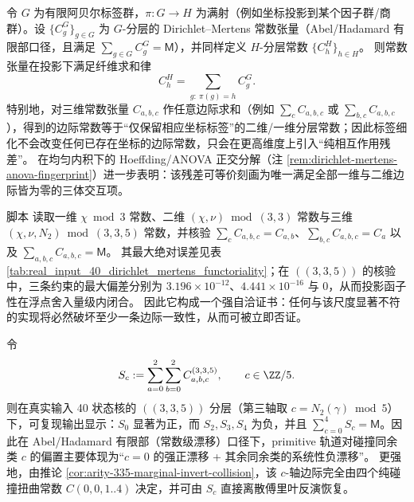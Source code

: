 \begin{remark}\label{thm:dirichlet-mertens-functoriality}
令 \(G\) 为有限阿贝尔标签群，\(\pi:G\to H\) 为满射（例如坐标投影到某个因子群/商群）。设
\(\{C^G_g\}_{g\in G}\) 为 \(G\)-分层的 Dirichlet--Mertens 常数张量（Abel/Hadamard 有限部口径，且满足 \(\sum_{g\in G}C^G_g=\mathsf{M}\)），并同样定义 \(H\)-分层常数 \(\{C^H_h\}_{h\in H}\)。
则常数张量在投影下满足纤维求和律
\[
C^H_h=\sum_{g:\ \pi(g)=h}C^G_g.
\]
特别地，对三维常数张量 \(C_{a,b,c}\) 作任意边际求和（例如 \(\sum_c C_{a,b,c}\) 或 \(\sum_{b,c}C_{a,b,c}\)），得到的边际常数等于“仅保留相应坐标标签”的二维/一维分层常数；因此标签细化不会改变任何已存在坐标的边际常数，只会在更高维度上引入“纯相互作用残差”。
在均匀内积下的 Hoeffding/ANOVA 正交分解（注 \ref{rem:dirichlet-mertens-anova-fingerprint}）进一步表明：该残差可等价刻画为唯一满足全部一维与二维边际皆为零的三体交互项。
\end{remark}

\begin{remark}\label{rem:dirichlet-mertens-functoriality-check}
脚本  读取一维 \(\chi\bmod 3\) 常数、二维 \((\chi,\nu)\bmod(3,3)\) 常数与三维 \((\chi,\nu,N_2)\bmod(3,3,5)\) 常数，并核验
\(\sum_c C_{a,b,c}=C_{a,b}\)、\(\sum_{b,c}C_{a,b,c}=C_a\) 以及 \(\sum_{a,b,c}C_{a,b,c}=\mathsf{M}\)。
其最大绝对误差见表 \ref{tab:real_input_40_dirichlet_mertens_functoriality}；在 \(((3,3,5))\) 的核验中，三条约束的最大偏差分别为 \(3.196\times 10^{-12}\)、\(4.441\times 10^{-16}\) 与 \(0\)，从而投影函子性在浮点舍入量级内闭合。
因此它构成一个强自洽证书：任何与该尺度显著不符的实现将必然破坏至少一条边际一致性，从而可被立即否证。
\end{remark}



\begin{remark}\label{cor:arity-335-collision-residue-drift}
令
\[
S_c:=\sum_{a=0}^{2}\sum_{b=0}^{2}C^{(3,3,5)}_{a,b,c},
\qquad c\in\ZZ/5.
\]
则在真实输入 40 状态核的 \(((3,3,5))\) 分层（第三轴取 $c=N_2(\gamma)\bmod 5$）下，可复现输出显示：$S_0$ 显著为正，而 $S_2,S_3,S_4$ 为负，并且 $\sum_{c=0}^4 S_c=\mathsf{M}$。因此在 Abel/Hadamard 有限部（常数级漂移）口径下，primitive 轨道对碰撞同余类 $c$ 的偏置主要体现为“$c=0$ 的强正漂移 + 其余同余类的系统性负漂移”。
更强地，由推论 \ref{cor:arity-335-marginal-invert-collision}，该 \(c\)-轴边际完全由四个纯碰撞扭曲常数 \(C(0,0,1..4)\) 决定，并可由 \(S_c\) 直接离散傅里叶反演恢复。
\end{remark}

